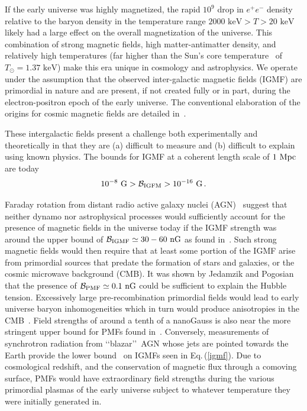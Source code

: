 \documentclass[a4paper]{article}
\newcommand*{\keV}{\text{ keV}}
\newcommand{\req}[1]{Eq.\,(\ref{#1})}
\begin{document}
If the early universe was highly magnetized, the rapid $10^{9}$ drop in $e^{+}e^{-}$ density relative to the baryon density in the temperature range $2000\keV>T>20\keV$ likely had a large effect on the overall magnetization of the universe. This combination of strong magnetic fields, high matter-antimatter density, and relatively high temperatures (far higher than the Sun's core temperature~\cite{bahcall2001solar} of $T_{\odot}=1.37\keV$) make this era unique in cosmology and astrophysics. We operate under the assumption that the observed inter-galactic magnetic fields (IGMF) are primordial in nature and are present, if not created fully or in part, during the electron-positron epoch of the early universe. The conventional elaboration of the origins for cosmic magnetic fields are detailed in~\cite{gaensler2004origin,durrer2013cosmological,batista2021gammaray}.

These intergalactic fields present a challenge both experimentally and theoretically in that they are (a) difficult to measure and (b) difficult to explain using known physics. The bounds for IGMF at a coherent length scale of $1{\rm\ Mpc}$ are today~\cite{neronov2010evidence,taylor2011extragalactic,pshirkov2015new,vernstrom2021discovery}
\begin{align}
    \label{igmf}
    10^{-8}{\rm\ G}>\mathcal{B}_{\rm IGFM}>10^{-16}{\rm\ G}\,.
\end{align}

Faraday rotation from distant radio active galaxy nuclei (AGN)~\cite{pomakov2022redshift} suggest that neither dynamo nor astrophysical processes would sufficiently account for the presence of magnetic fields in the universe today if the IGMF strength was around the upper bound of ${\cal B}_{\rm IGMF}\simeq30-60{\rm\ nG}$ as found in~\cite{vernstrom2021discovery}. Such strong magnetic fields would then require that at least some portion of the IGMF arise from primordial sources that predate the formation of stars and galaxies, or the cosmic microwave background (CMB). It was shown by Jedamzik and Pogosian~\cite{jedamzik2020relieving} that the presence of ${\cal B}_{\rm PMF}\simeq0.1{\rm\ nG}$ could be sufficient to explain the Hubble tension. Excessively large pre-recombination primordial fields would lead to early universe baryon inhomogeneities which in turn would produce anisotropies in the CMB~\cite{jedamzik2013smallscale}. Field strengths of around a tenth of a nanoGauss is also near the more stringent upper bound for PMFs found in~\cite{pshirkov2015new,jedamzik2019stringent}. Conversely, measurements of synchrotron radiation from \lq\lq blazar\rq\rq\ AGN whose jets are pointed towards the Earth provide the lower bound~\cite{neronov2010evidence,taylor2011extragalactic} on IGMFs seen in \req{igmf}. Due to cosmological redshift, and the conservation of magnetic flux through a comoving surface, PMFs would have extraordinary field strengths during the various primordial plasmas of the early universe subject to whatever temperature they were initially generated in.
\end{document}
